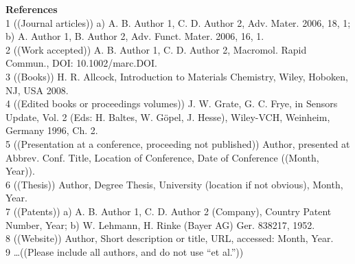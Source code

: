 \documentclass{WileyMSP-template}
\begin{document}
\textbf{References}\\

1	((Journal articles)) a) A. B. Author 1, C. D. Author 2, Adv. Mater. 2006, 18, 1; b) A. Author 1, B. Author 2, Adv. Funct. Mater. 2006, 16, 1.\\
2	((Work accepted)) A. B. Author 1, C. D. Author 2, Macromol. Rapid Commun., DOI: 10.1002/marc.DOI.\\
3	((Books)) H. R. Allcock, Introduction to Materials Chemistry, Wiley, Hoboken, NJ, USA 2008.\\
4	((Edited books or proceedings volumes)) J. W. Grate, G. C. Frye, in Sensors Update, Vol. 2 (Eds: H. Baltes, W. Göpel, J. Hesse), Wiley-VCH, Weinheim, Germany 1996, Ch. 2.\\
5	((Presentation at a conference, proceeding not published)) Author, presented at Abbrev. Conf. Title, Location of Conference, Date of Conference ((Month, Year)).\\
6	((Thesis)) Author, Degree Thesis, University (location if not obvious), Month, Year.\\
7	((Patents)) a) A. B. Author 1, C. D. Author 2 (Company), Country Patent Number, Year; b) W. Lehmann, H. Rinke (Bayer AG) Ger. 838217, 1952.\\
8	((Website)) Author, Short description or title, URL, accessed: Month, Year.\\
9	…((Please include all authors, and do not use “et al.”))\\




\end{document}
